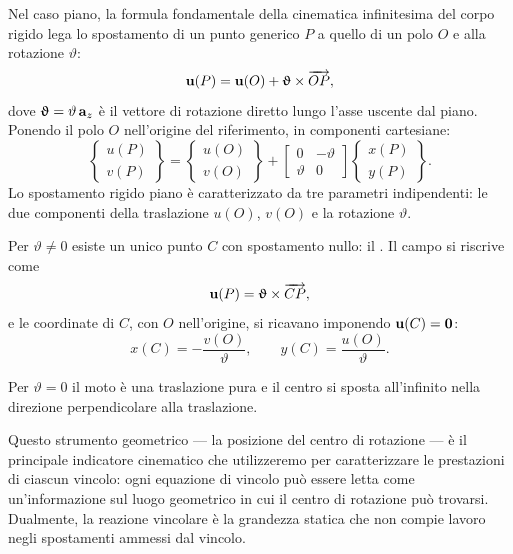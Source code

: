 Nel caso piano, la formula fondamentale della cinematica infinitesima
del corpo rigido lega lo spostamento di un punto generico $P$ a quello
di un polo $O$ e alla rotazione $\vartheta$:
\begin{equation}\label{eq:FFCI_piano_vett}
	\mathbf{u}(P) = \mathbf{u}(O) + \bm{\upvartheta} \times \overrightarrow{OP},
\end{equation}
dove $\bm{\upvartheta} = \vartheta\,\mathbf{a}_z$ è il vettore di rotazione
diretto lungo l'asse uscente dal piano. Ponendo il polo $O$
nell'origine del riferimento, in componenti cartesiane:
\begin{equation}\label{eq:FFCI_piano}
	\begin{Bmatrix} u(P) \\ v(P) \end{Bmatrix}
	=
	\begin{Bmatrix} u(O) \\ v(O) \end{Bmatrix}
	+
	\begin{bmatrix} 0 & -\vartheta \\ \vartheta & 0 \end{bmatrix}
	\begin{Bmatrix} x(P) \\ y(P) \end{Bmatrix}.
\end{equation}
Lo spostamento rigido piano è caratterizzato da tre parametri
indipendenti: le due componenti della traslazione $u(O)$, $v(O)$ e
la rotazione $\vartheta$.

Per $\vartheta \neq 0$ esiste un unico punto $C$ con spostamento
nullo: il \CRa. Il campo si riscrive come
\begin{equation}\label{eq:centro_campo}
	\mathbf{u}(P) = \bm{\upvartheta} \times \overrightarrow{CP},
\end{equation}
e le coordinate di $C$, con $O$ nell'origine, si ricavano
imponendo $\mathbf{u}(C) = \mathbf{0}$:
\begin{equation}\label{eq:coord_C}
	x(C) = -\frac{v(O)}{\vartheta}, \qquad
	y(C) = \frac{u(O)}{\vartheta}.
\end{equation}

Per $\vartheta = 0$ il moto è una traslazione pura e il centro
si sposta all'infinito nella direzione perpendicolare alla
traslazione.

\medskip

Questo strumento geometrico --- la posizione del centro di
rotazione --- è il principale indicatore cinematico che
utilizzeremo per caratterizzare le prestazioni di ciascun
vincolo: ogni equazione di vincolo può essere letta come
un'informazione sul luogo geometrico in cui il centro di
rotazione può trovarsi. Dualmente, la reazione vincolare
è la grandezza statica che non compie lavoro negli
spostamenti ammessi dal vincolo.


